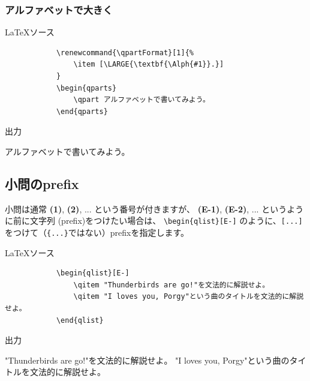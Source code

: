 \documentclass[dvipdfmx,a4j,11pt]{jarticle}
\newenvironment{inputbox}{%
	\begin{itembox}[r]{\LaTeX ソース}
}{
	\end{itembox}
}
\newenvironment{outputbox}{%
	\begin{itembox}[r]{出力}
}{%
	\end{itembox}
}
\begin{document}
\subsubsection{アルファベットで大きく}
	\begin{inputbox}
		\begin{verbatim}
			\renewcommand{\qpartFormat}[1]{%
			    \item [\LARGE{\textbf{\Alph{#1}}.}]
			}
			\begin{qparts}
			    \qpart アルファベットで書いてみよう。
			\end{qparts}
		\end{verbatim}

	\end{inputbox}
	
	\begin{outputbox}
		\renewcommand{\qpartFormat}[1]{%
			\item [\LARGE{\textbf{\Alph{#1}}.}]
		}
		\begin{qparts}
			\qpart アルファベットで書いてみよう。
		\end{qparts}
	\end{outputbox}
	
\subsection{小問のprefix}
	小問は通常 {\bf (1)}, {\bf (2)}, ... という番号が付きますが、
	{\bf (E-1)}, {\bf (E-2)}, ... というように前に文字列 (prefix)をつけたい場合は、
	{\tt \verb"\begin{qlist}[E-]"} のように、{\tt [...]}をつけて（{\tt \{...\}}ではない）prefixを指定します。
	\begin{inputbox}
		\begin{verbatim}
			\begin{qlist}[E-]
			    \qitem "Thunderbirds are go!"を文法的に解説せよ。
			    \qitem "I loves you, Porgy"という曲のタイトルを文法的に解説せよ。
			\end{qlist}
		\end{verbatim}
	\end{inputbox}
	
	\begin{outputbox}
			\hspace{5mm}
			\begin{minipage}{0.8\linewidth}
			\begin{qlist}[E-]
			    \qitem "Thunderbirds are go!"を文法的に解説せよ。
			    \qitem "I loves you, Porgy"という曲のタイトルを文法的に解説せよ。
			\end{qlist}
			\end{minipage}
	\end{outputbox}
	
\end{document}
